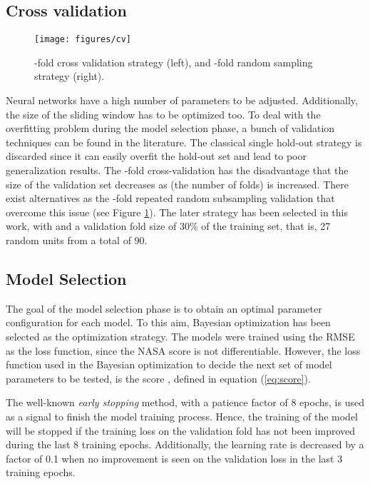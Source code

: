 \documentclass[PHM, 2021]{PHMSociety}
\begin{document}
\subsection{Cross validation}

\begin{figure}[t]
\centering
\texttt{[image: figures/cv]}
\caption{-fold cross validation strategy (left), and -fold random sampling strategy (right).}
\label{fig:cv}
\end{figure}

Neural networks have a high number of parameters to be adjusted. Additionally, the size of the sliding window has to be optimized too. To deal with the overfitting problem during the model selection phase, a bunch of validation techniques can be found in the literature. The classical single hold-out strategy is discarded since it can easily overfit the hold-out set and lead to poor generalization results. The -fold cross-validation has the disadvantage that the size of the validation set decreases as  (the number of folds) is increased. There exist alternatives as the -fold repeated random subsampling validation that overcome this issue (see Figure \ref{fig:cv}). The later strategy has been selected in this work, with  and a validation fold size of 30\% of the training set, that is, 27 random units from a total of 90.

\subsection{Model Selection}



The goal of the model selection phase is to obtain an optimal parameter configuration for each model. To this aim, Bayesian optimization has been selected as the optimization strategy. The models were trained using the RMSE as the loss function, since the NASA score is not differentiable. However, the loss function used in the Bayesian optimization to decide the next set of model parameters to be tested, is the score , defined in equation (\ref{eq:score}). 



The well-known \emph{early stopping} method, with a patience factor of 8 epochs, is used as a signal to finish the model training process. Hence, the training of the model will be stopped if the training loss on the validation fold has not been improved during the last 8 training epochs. Additionally, the learning rate is decreased by a factor of 0.1 when no improvement is seen on the validation loss in the last 3 training epochs.
\end{document}
